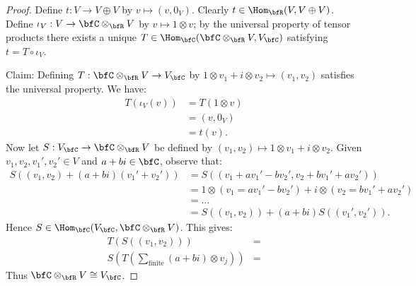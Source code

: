 \documentclass[10pt,twoside,openany]{memoir}
\begin{document}
        \begin{proof}
            Define $t:V \rightarrow V \oplus V$ by $v \mapsto (v,0_V)$. Clearly $t \in \Hom_\bfR(V,V \oplus V)$. Define $\iota_V: V \rightarrow \bfC \otimes_\bfR V$ by $v \mapsto 1 \otimes v$; by the universal property of tensor products there exists a unique $T \in \Hom_\bfC(\bfC \otimes_\bfR V , V_\bfC)$ satisfying $t = T \circ \iota_V$. 
            
            Claim: Defining $T: \bfC \otimes_\bfR V \rightarrow V_\bfC$ by $1 \otimes v_1 + i \otimes v_2 \mapsto (v_1,v_2)$ satisfies the universal property. We have:
                \begin{equation*}
                \begin{split}
                    T(\iota_V(v))
                    & = T(1 \otimes v) \\
                    & = (v,0_V) \\
                    & = t(v).
                \end{split}
                \end{equation*}
            Now let $S:V_\bfC \rightarrow \bfC \otimes_\bfR V$ be defined by $(v_1,v_2) \mapsto 1 \otimes v_1 + i \otimes v_2$. Given $v_1,v_2,v_1',v_2' \in V$ and $a+bi \in \bfC$, observe that:
                \begin{equation*}
                \begin{split}
                    S((v_1,v_2) + (a+bi)(v_1' + v_2'))
                    & = S((v_1 + av_1' - bv_2', v_2 + bv_1' + av_2')) \\
                    & = 1 \otimes (v_1 = av_1' - bv_2') + i \otimes (v_2 = bv_1' + av_2') \\
                    & = ... \\
                    & = S((v_1,v_2)) + (a+bi)S((v_1',v_2')).
                \end{split}
                \end{equation*}
            Hence $S \in \Hom_\bfC(V_\bfC,\bfC \otimes_\bfR V)$. This gives:
                \begin{equation*}
                \begin{split}
                    T(S((v_1,v_2))) & = \\
                    S \left( T \left( \sum_{\text{finite}} (a+bi) \otimes v_j\right)\right) &= 
                \end{split}
                \end{equation*}
            Thus $\bfC \otimes_\bfR V \cong V_\bfC$.
        \end{proof}
\end{document}
